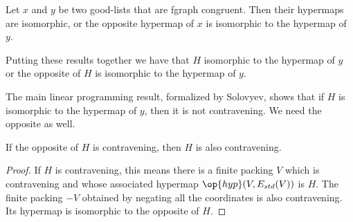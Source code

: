 \begin{lemma}
Let $x$ and $y$ be two good-lists that are fgraph congruent.
Then their hypermaps are isomorphic, or the opposite hypermap of $x$
is isomorphic to the hypermap of $y$.
\end{lemma} 

Putting these results together we have that $H$ isomorphic to the
hypermap of $y$ or the opposite of $H$ is isomorphic to the hypermap
of $y$.

The main linear programming result, formalized by Solovyev, shows
that if $H$ is isomorphic to the hypermap of $y$, then it is not
contravening.  We need the opposite as well.

\begin{lemma}
 If the opposite of $H$ is contravening, then  $H$
is also contravening.  
\end{lemma} 

\begin{proof}
  If $H$ is contravening, this means there is a finite packing $V$
  which is contravening and whose associated hypermap
  $\op{hyp}(V,E_{std}(V))$ is $H$.  The finite packing $-V$ obtained
  by negating all the coordinates is also contravening.  Its hypermap
  is isomorphic to the opposite of $H$.
\end{proof}

